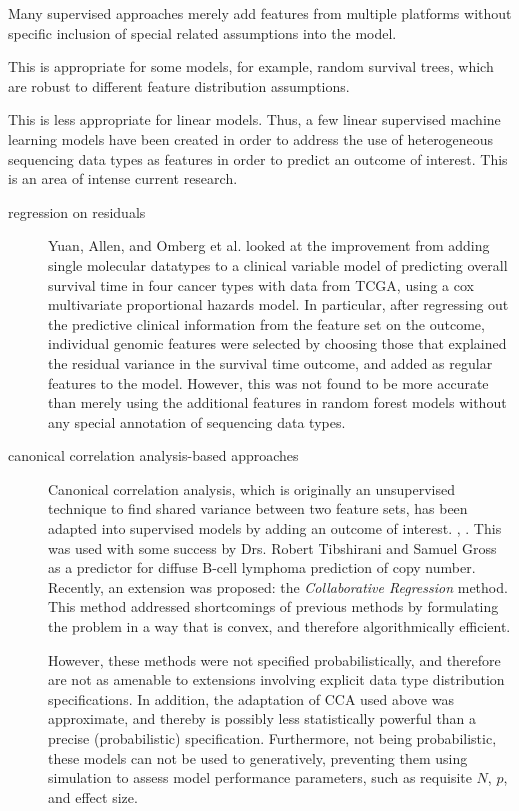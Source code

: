 Many supervised approaches merely add features from multiple platforms without specific inclusion of special related assumptions into the model.

This is appropriate for some models, for example, random survival trees, which are robust to different feature distribution assumptions.

This is less appropriate for linear models. Thus, a few linear supervised machine learning models have been created in order to address the use of heterogeneous sequencing data types as features in order to predict an outcome of interest. This is an area of intense current research.

\begin{description}
\item[regression on residuals]
  Yuan, Allen, and Omberg et al. \cite{yuan_assessing_2014} looked at the improvement from adding single molecular datatypes to a clinical variable model of predicting overall survival time in four cancer types with data from TCGA, using a cox multivariate proportional hazards model. In particular, after regressing out the predictive clinical information from the feature set on the outcome, individual genomic features were selected by choosing those that explained the residual variance in the survival time outcome, and added as regular features to the model. However, this was not found to be more accurate than merely using the additional features in random forest models without any special annotation of sequencing data types.  


\item[canonical correlation analysis-based approaches]
  Canonical correlation analysis, which is originally an unsupervised technique to find shared variance between two feature sets, has been adapted into supervised models by adding an outcome of interest. , \cite{witten_extensions_2009}. This was used with some success by Drs. Robert Tibshirani and Samuel Gross as a predictor for diffuse B-cell lymphoma prediction of copy number. Recently, an extension was proposed: the \textit{Collaborative Regression} method\cite{gross_collaborative_2015}. This method addressed shortcomings of previous methods by formulating the problem in a way that is convex, and therefore algorithmically efficient.

  However, these methods were not specified probabilistically, and therefore are not as amenable to extensions involving explicit data type distribution specifications. In addition, the adaptation of CCA used above was approximate, and thereby is possibly less statistically powerful than a precise (probabilistic) specification. Furthermore, not being probabilistic, these models can not be used to generatively, preventing them using simulation to assess model performance parameters, such as requisite $N$, $p$, and effect size. 
  
\end{description}


